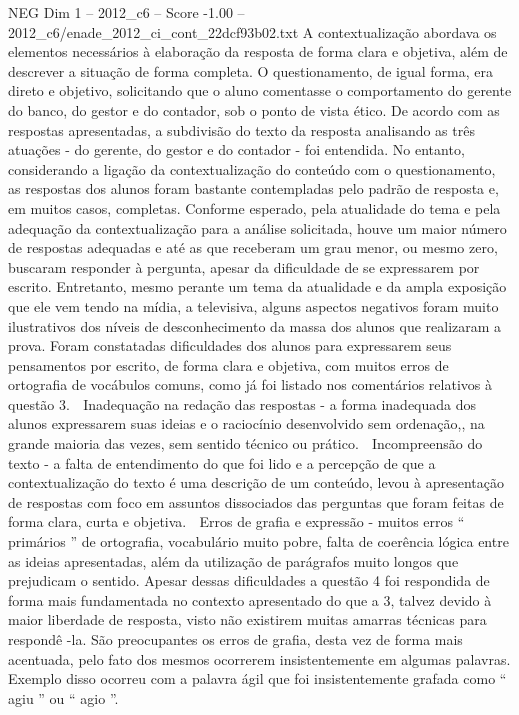 \begin{textsample}{NEG Dim 1 – 2012\_c6 – Score -1.00 – 2012\_c6/enade\_2012\_ci\_cont\_22dcf93b02.txt}
A contextualização abordava os elementos necessários à elaboração da resposta de forma clara e objetiva, além de descrever a situação de forma completa.
O questionamento, de igual forma, era direto e objetivo, solicitando que o aluno comentasse o comportamento do gerente do banco, do gestor e do contador, sob o ponto de vista ético.
De acordo com as respostas apresentadas, a subdivisão do texto da resposta analisando as três atuações - do gerente, do gestor e do contador - foi entendida.
No entanto, considerando a ligação da contextualização do conteúdo com o questionamento, as respostas dos alunos foram bastante contempladas pelo padrão de resposta e, em muitos casos, completas.
Conforme esperado, pela atualidade do tema e pela adequação da contextualização para a análise solicitada, houve um maior número de respostas adequadas e até as que receberam um grau menor, ou mesmo zero, buscaram responder à pergunta, apesar da dificuldade de se expressarem por escrito.
Entretanto, mesmo perante um tema da atualidade e da ampla exposição que ele vem tendo na mídia, a televisiva, alguns aspectos negativos foram muito ilustrativos dos níveis de desconhecimento da massa dos alunos que realizaram a prova.
Foram constatadas dificuldades dos alunos para expressarem seus pensamentos por escrito, de forma clara e objetiva, com muitos erros de ortografia de vocábulos comuns, como já foi listado nos comentários relativos à questão 3.  Inadequação na redação das respostas - a forma inadequada dos alunos expressarem suas ideias e o raciocínio desenvolvido sem ordenação,, na grande maioria das vezes, sem sentido técnico ou prático.  Incompreensão do texto - a falta de entendimento do que foi lido e a percepção de que a contextualização do texto é uma descrição de um conteúdo, levou à apresentação de respostas com foco em assuntos dissociados das perguntas que foram feitas de forma clara, curta e objetiva.  Erros de grafia e expressão - muitos erros “ primários ” de ortografia, vocabulário muito pobre, falta de coerência lógica entre as ideias apresentadas, além da utilização de parágrafos muito longos que prejudicam o sentido.
Apesar dessas dificuldades a questão 4 foi respondida de forma mais fundamentada no contexto apresentado do que a 3, talvez devido à maior liberdade de resposta, visto não existirem muitas amarras técnicas para respondê -la.
São preocupantes os erros de grafia, desta vez de forma mais acentuada, pelo fato dos mesmos ocorrerem insistentemente em algumas palavras.
Exemplo disso ocorreu com a palavra ágil que foi insistentemente grafada como “ agiu ” ou “ agio ”.

\end{textsample}
